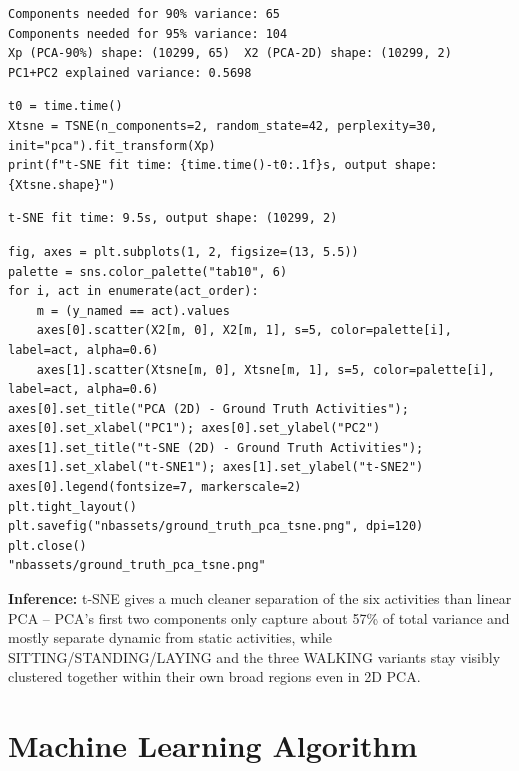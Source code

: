 \documentclass[12pt,a4paper]{article}
\begin{document}
\begin{verbatim}
Components needed for 90% variance: 65
Components needed for 95% variance: 104
Xp (PCA-90%) shape: (10299, 65)  X2 (PCA-2D) shape: (10299, 2)
PC1+PC2 explained variance: 0.5698
\end{verbatim}


\begin{verbatim}
t0 = time.time()
Xtsne = TSNE(n_components=2, random_state=42, perplexity=30, init="pca").fit_transform(Xp)
print(f"t-SNE fit time: {time.time()-t0:.1f}s, output shape: {Xtsne.shape}")
\end{verbatim}

\begin{verbatim}
t-SNE fit time: 9.5s, output shape: (10299, 2)
\end{verbatim}


\begin{verbatim}
fig, axes = plt.subplots(1, 2, figsize=(13, 5.5))
palette = sns.color_palette("tab10", 6)
for i, act in enumerate(act_order):
    m = (y_named == act).values
    axes[0].scatter(X2[m, 0], X2[m, 1], s=5, color=palette[i], label=act, alpha=0.6)
    axes[1].scatter(Xtsne[m, 0], Xtsne[m, 1], s=5, color=palette[i], label=act, alpha=0.6)
axes[0].set_title("PCA (2D) - Ground Truth Activities"); axes[0].set_xlabel("PC1"); axes[0].set_ylabel("PC2")
axes[1].set_title("t-SNE (2D) - Ground Truth Activities"); axes[1].set_xlabel("t-SNE1"); axes[1].set_ylabel("t-SNE2")
axes[0].legend(fontsize=7, markerscale=2)
plt.tight_layout()
plt.savefig("nbassets/ground_truth_pca_tsne.png", dpi=120)
plt.close()
"nbassets/ground_truth_pca_tsne.png"
\end{verbatim}

\url{}

\textbf{Inference:} t-SNE gives a much cleaner separation of the six activities
than linear PCA -- PCA's first two components only capture about 57\% of
total variance and mostly separate dynamic from static activities, while
SITTING/STANDING/LAYING and the three WALKING variants stay visibly
clustered together within their own broad regions even in 2D PCA.

\section{Machine Learning Algorithm}
\label{sec:org759ecd3}
\end{document}
